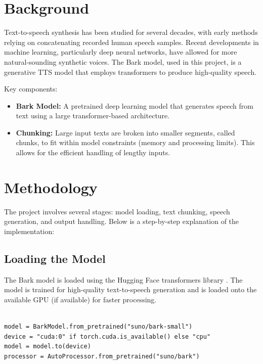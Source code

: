 \documentclass[12pt, a4paper]{article}
\begin{document}
\section{Background}

Text-to-speech synthesis has been studied for several decades, with early methods relying on concatenating recorded human speech samples. Recent developments in machine learning, particularly deep neural networks, have allowed for more natural-sounding synthetic voices. The Bark model, used in this project, is a generative TTS model that employs transformers to produce high-quality speech.

Key components:

\begin{itemize}

\item \textbf{Bark Model:} A pretrained deep learning model that generates speech from text using a large transformer-based architecture.

\item \textbf{Chunking:} Large input texts are broken into smaller segments, called chunks, to fit within model constraints (memory and processing limits). This allows for the efficient handling of lengthy inputs.

\end{itemize}

\section{Methodology}

The project involves several stages: model loading, text chunking, speech generation, and output handling. Below is a step-by-step explanation of the implementation:
 
\subsection{Loading the Model}

The Bark model is loaded using the Hugging Face transformers library \cite{huggingfaceHuggingFace}. The model is trained for high-quality text-to-speech generation and is loaded onto the available GPU (if available) for faster processing.

\begin{verbatim}

model = BarkModel.from_pretrained("suno/bark-small")
device = "cuda:0" if torch.cuda.is_available() else "cpu"
model = model.to(device)
processor = AutoProcessor.from_pretrained("suno/bark")

\end{verbatim}
\end{document}
